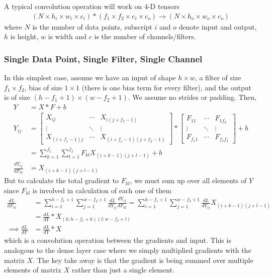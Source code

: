 \documentclass[../../deep_learning_notes.tex]{subfiles}
\begin{document}
A typical convolution operation will work on 4-D tensors
\begin{align*}
    (N \times h_{i} \times w_{i} \times c_{i}) * (f_{1} \times f_{2} \times c_{i} \times c_{o}) \rightarrow (N \times h_{o} \times w_{o} \times c_{o})
\end{align*}
where $N$ is the number of data points, subscript $i$ and $o$ denote input and output, $h$ is height, $w$ is width and $c$ is the number of channels/filters.


\subsubsection{Single Data Point, Single Filter, Single Channel}
In this simplest case, assume we have an input of shape $h \times w$, a filter of size $f_{1} \times f_{2}$, bias of size $1 \times 1$ (there is one bias term for every filter), and the output is of size $(h - f_{1} + 1) \times (w - f_{2} + 1)$. We assume no strides or padding. Then,
\begin{align*}
    Y &= X * F + b\\
    Y_{ij} &= \begin{bmatrix}
        X_{ij} &\cdots &X_{i(j + f_{2}-1)}\\
        \vdots &\ddots &\vdots\\
        X_{(i+f_{1}-1)j} &\cdots &X_{(i+f_{1}-1)(j+f_{2}-1)}
    \end{bmatrix}*
    \begin{bmatrix}
        F_{11} &\cdots &F_{1f_{2}}\\
        \vdots &\ddots &\vdots\\
        F_{f_{1}1} &\cdots &F_{f_{1}f_{2}}
    \end{bmatrix} + b\\
    &= \sum_{k=1}^{f_{1}} \sum_{l=1}^{f_{2}} F_{kl} X_{(i+k-1)(j+l-1)} + b\\
    \frac{dY_{ij}}{dF_{kl}} &= X_{(i+k-1)(j+l-1)}
\end{align*}
But to calculate the total gradient to $F_{kl}$, we must sum up over all elements of $Y$ since $F_{kl}$ is involved in calculation of each one of them
\begin{align*}
    \frac{dL}{dF_{kl}} &= \sum_{i=1}^{h - f_{1} + 1} \sum_{j=1}^{w - f_{2} + 1} \frac{dL}{dY_{ij}} \frac{dY_{ij}}{dF_{kl}}
    = \sum_{i=1}^{h - f_{1} + 1} \sum_{j=1}^{w - f_{2} + 1} \frac{dL}{dY_{ij}} X_{(i+k-1)(j+l-1)}\\
    &= \frac{dL}{dY} * X_{(k:h-f_{1}+k)(l:w-f_{2}+l)}\\
    \implies \frac{dL}{dF} &= \frac{dL}{dY} * X
\end{align*}
which is a convolution operation between the gradients and input. This is analogous to the dense layer case where we simply multiplied gradients with the matrix $X$. The key take away is that the gradient is being summed over multiple elements of matrix $X$ rather than just a single element.\newline
\end{document}
